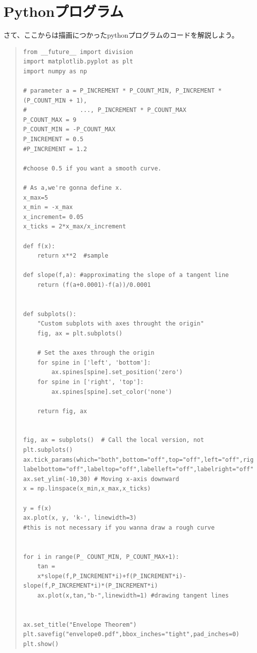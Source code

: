 \documentclass[11pt,a4j,fleqn]{jarticle}
\begin{document}
\section{Pythonプログラム}

さて、ここからは描画につかったpythonプログラムのコードを解説しよう。


\begin{quote}
\begin{verbatim}
from __future__ import division
import matplotlib.pyplot as plt
import numpy as np

# parameter a = P_INCREMENT * P_COUNT_MIN, P_INCREMENT * (P_COUNT_MIN + 1),
#               ..., P_INCREMENT * P_COUNT_MAX
P_COUNT_MAX = 9
P_COUNT_MIN = -P_COUNT_MAX
P_INCREMENT = 0.5
#P_INCREMENT = 1.2

#choose 0.5 if you want a smooth curve.

# As a,we're gonna define x. 
x_max=5
x_min = -x_max
x_increment= 0.05
x_ticks = 2*x_max/x_increment

def f(x):
	return x**2  #sample

def slope(f,a): #approximating the slope of a tangent line
	return (f(a+0.0001)-f(a))/0.0001


def subplots():
    "Custom subplots with axes throught the origin"
    fig, ax = plt.subplots()

    # Set the axes through the origin
    for spine in ['left', 'bottom']:
        ax.spines[spine].set_position('zero')
    for spine in ['right', 'top']:
        ax.spines[spine].set_color('none')

    return fig, ax


fig, ax = subplots()  # Call the local version, not plt.subplots()
ax.tick_params(which="both",bottom="off",top="off",left="off",right="off",
labelbottom="off",labeltop="off",labelleft="off",labelright="off")
ax.set_ylim(-10,30) # Moving x-axis downward 
x = np.linspace(x_min,x_max,x_ticks)

y = f(x)
ax.plot(x, y, 'k-', linewidth=3)
#this is not necessary if you wanna draw a rough curve


for i in range(P_ COUNT_MIN, P_COUNT_MAX+1):
	tan = 
	x*slope(f,P_INCREMENT*i)+f(P_INCREMENT*i)-slope(f,P_INCREMENT*i)*(P_INCREMENT*i)
	ax.plot(x,tan,"b-",linewidth=1) #drawing tangent lines


ax.set_title("Envelope Theorem")
plt.savefig("envelope0.pdf",bbox_inches="tight",pad_inches=0)
plt.show()
\end{verbatim}
\end{quote}
\end{document}

